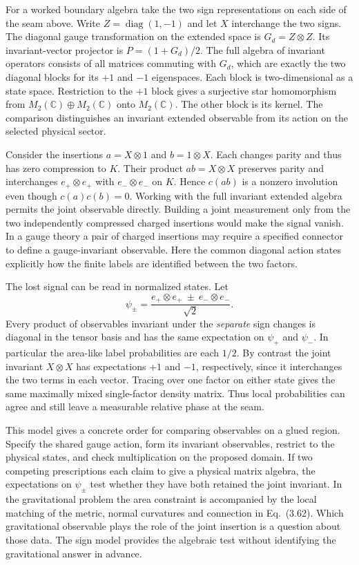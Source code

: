 \documentclass[11pt,letterpaper]{article}
\newcommand{\CC}{\mathbb C}
\begin{document}
For a worked boundary algebra take the two sign representations on each
side of the seam above. Write \(Z=\operatorname{diag}(1,-1)\) and let
\(X\) interchange the two signs. The diagonal gauge transformation on the
extended space is \(G_d=Z\otimes Z\). Its invariant-vector projector
is \(P=(1+G_d)/2\). The full algebra of invariant operators consists of
all matrices commuting with \(G_d\), which are exactly the two diagonal
blocks for its \(+1\) and \(-1\) eigenspaces. Each block is
two-dimensional as a state space. Restriction to the \(+1\) block gives a
surjective star homomorphism from
\(M_2(\CC)\oplus M_2(\CC)\) onto \(M_2(\CC)\).
The other block is its kernel. The comparison distinguishes an invariant
extended observable from its action on the selected physical sector.

Consider the insertions \(a=X\otimes 1\) and \(b=1\otimes X\).
Each changes parity and thus has zero compression to \(K\).
Their product \(ab=X\otimes X\) preserves parity and interchanges
\(e_+\otimes e_+\) with \(e_-\otimes e_-\) on \(K\).
Hence \(c(ab)\) is a nonzero involution even though
\(c(a)c(b)=0\). Working with the full invariant extended algebra permits
the joint observable directly. Building a joint measurement only from
the two independently compressed charged insertions would make the signal
vanish. In a gauge theory a pair of charged insertions may require
a specified connector to define a gauge-invariant observable. Here the
common diagonal action states explicitly how the finite labels are
identified between the two factors.

The lost signal can be read in normalized states. Let
\[
 \psi_\pm=\frac{e_+\otimes e_+\ \pm\ e_-\otimes e_-}{\sqrt2}.
\]
Every product of observables invariant under the \emph{separate} sign
changes is diagonal in the tensor basis and has the same expectation on
\(\psi_+\) and \(\psi_-\). In particular the area-like label probabilities
are each \(1/2\). By contrast the joint invariant \(X\otimes X\) has
expectations \(+1\) and \(-1\), respectively, since it interchanges the two
terms in each vector. Tracing over one factor on either state gives the
same maximally mixed single-factor density matrix.
Thus local probabilities can agree and still leave a measurable relative
phase at the seam.

This model gives a concrete order for comparing observables on a glued
region. Specify the shared gauge action, form its invariant observables,
restrict to the physical states, and check multiplication on the proposed
domain. If two competing prescriptions each claim to give a physical matrix
algebra, the expectations on \(\psi_\pm\) test whether they have both
retained the joint invariant. In the gravitational problem the area
constraint is accompanied by the local matching of the metric, normal
curvatures and connection in Eq.~(3.62). Which gravitational observable
plays the role of the joint insertion is a question about those data.
The sign model provides the algebraic test without identifying the
gravitational answer in advance.
\end{document}

